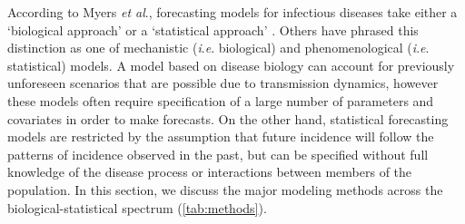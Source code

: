 \documentclass[a4paper]{article}
\newcommand{\etal}{\textit{et al}.}
\newcommand{\ie}{\textit{i}.\textit{e}. }
\begin{document}
According to Myers \etal, forecasting models for infectious diseases take either a `biological approach' or a `statistical approach' \cite{Myers2000}.
Others have phrased this distinction as one of mechanistic (\ie biological) and phenomenological (\ie statistical) models.
A model based on disease biology can account for previously unforeseen scenarios that are possible due to transmission dynamics, however these models often require specification of a large number of parameters and covariates in order to make forecasts.
On the other hand, statistical forecasting models are restricted by the assumption that future incidence will follow the patterns of incidence observed in the past, but can be specified without full knowledge of the disease process or interactions between members of the population.
In this section, we discuss the major modeling methods across the biological-statistical spectrum (\autoref{tab:methods}).

\end{document}
